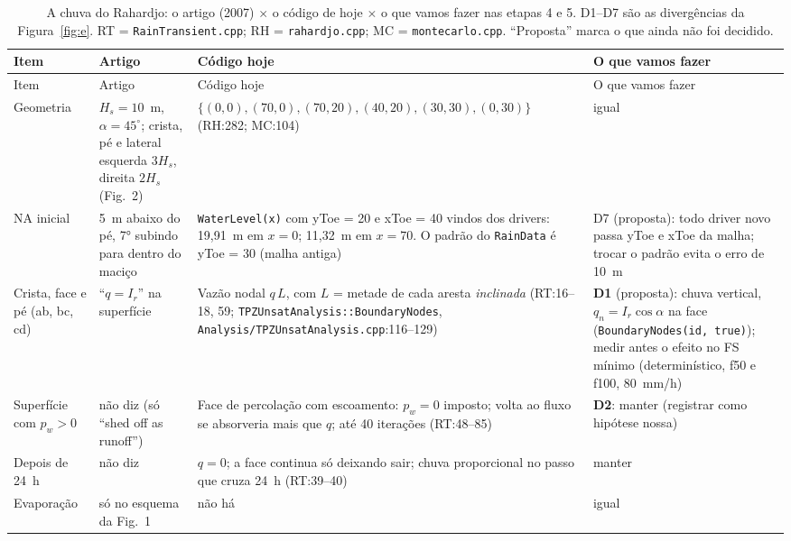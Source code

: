 \documentclass[11pt,a4paper]{article}
\begin{document}
\begin{landscape}
\footnotesize
\setlength{\tabcolsep}{4pt}\setlength{\LTcapwidth}{\linewidth}
\begin{longtable}{>{\raggedright}p{2.5cm}>{\raggedright}p{5.6cm}>{\raggedright}p{7.6cm}>{\raggedright\arraybackslash}p{6.9cm}}
\caption{A chuva do Rahardjo: o artigo (2007) $\times$ o código de hoje $\times$ o que vamos fazer nas etapas 4 e 5.
D1--D7 são as divergências da Figura~\ref{fig:e}. RT = \texttt{RainTransient.cpp}; RH = \texttt{rahardjo.cpp}; MC =
\texttt{montecarlo.cpp}. ``Proposta'' marca o que ainda não foi decidido.}\label{tab:rahardjo}\\
\toprule
Item & Artigo & Código hoje & O que vamos fazer \\
\midrule\endfirsthead
\toprule
Item & Artigo & Código hoje & O que vamos fazer \\
\midrule\endhead
\bottomrule\endfoot
Geometria & $H_s = 10$~m, $\alpha = 45^\circ$; crista, pé e lateral esquerda $3H_s$, direita $2H_s$ (Fig.~2) &
  $\{(0,0),(70,0),(70,20),(40,20),(30,30),(0,30)\}$ (RH:282; MC:104) & igual \\ \midrule
NA inicial & 5~m abaixo do pé, 7° subindo para dentro do maciço &
  \texttt{WaterLevel(x)} com yToe = 20 e xToe = 40 vindos dos drivers: 19,91~m em $x = 0$; 11,32~m em $x = 70$.
  O padrão do \texttt{RainData} é yToe = 30 (malha antiga) &
  D7 (proposta): todo driver novo passa yToe e xToe da malha; trocar o padrão evita o erro de 10~m \\ \midrule
Crista, face e pé (ab, bc, cd) & ``$q = I_r$'' na superfície &
  Vazão nodal $q\,L$, com $L$ = metade de cada aresta \emph{inclinada} (RT:16--18, 59;
  \texttt{TPZUnsatAnalysis::BoundaryNodes}, \texttt{Analysis/TPZUnsatAnalysis.cpp}:116--129) &
  \textbf{D1} (proposta): chuva vertical, $q_n = I_r\cos\alpha$ na face (\texttt{BoundaryNodes(id, true)}); medir antes
  o efeito no FS mínimo (determinístico, f50 e f100, 80~mm/h) \\ \midrule
Superfície com $p_w > 0$ & não diz (só ``shed off as runoff'') &
  Face de percolação com escoamento: $p_w = 0$ imposto; volta ao fluxo se absorveria mais que $q$; até 40 iterações
  (RT:48--85) & \textbf{D2}: manter (registrar como hipótese nossa) \\ \midrule
Depois de 24~h & não diz & $q = 0$; a face continua só deixando sair; chuva proporcional no passo que cruza 24~h
  (RT:39--40) & manter \\ \midrule
Evaporação & só no esquema da Fig.~1 & não há & igual \\ \midrule

\end{longtable}
\end{landscape}
\end{document}
